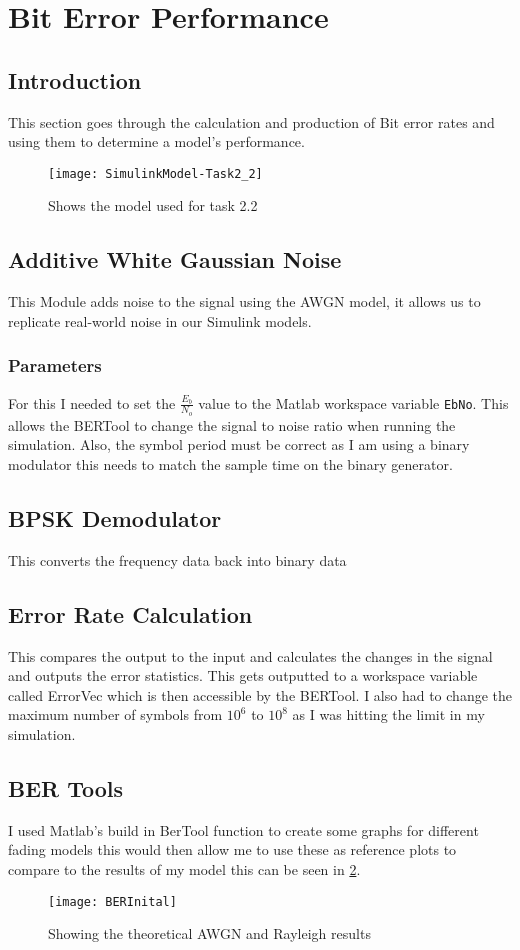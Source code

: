 \section{Bit Error Performance}{
    \subsection{Introduction}
    {
   		This section goes through the calculation and production of Bit error rates and using them to determine a model's performance.
   		\begin{figure}
   			\centering
   			\texttt{[image: SimulinkModel-Task2\_2]}
   			\caption{Shows the model used for task 2.2}
   			\label{fig:2.2SimlinkModel}
   		\end{figure}
   	}
   	\subsection{Additive White Gaussian Noise}
   	{
   		This Module adds noise to the signal using the AWGN model, it allows us to replicate real-world noise in our Simulink models.
   		\subsubsection{Parameters}
   		{
   			For this I needed to set the $\frac{E_b}{N_o}$ value to the Matlab workspace variable \lstinline|EbNo|. This allows the BERTool to change the signal to noise ratio when running the simulation. Also, the symbol period must be correct as I am using a binary modulator this needs to match the sample time on the binary generator.
   		}
	}
	\subsection{BPSK Demodulator}
	{
		This converts the frequency data back into binary data 
	}
	\subsection{Error Rate Calculation}
	{
		This compares the output to the input and calculates the changes in the signal and outputs the error statistics. This gets outputted to a workspace variable called ErrorVec which is then accessible by the BERTool. I also had to change the maximum number of symbols from $10^6$ to $10^8$ as I was hitting the limit in my simulation.
	}
	\subsection{BER Tools}
	{
		I used Matlab's build in BerTool function to create some graphs for different fading models this would then allow me to use these as reference plots to compare to the results of my model this can be seen in \cref{fig:BerInital}.
		\begin{figure}
			\centering
			\texttt{[image: BERInital]}
			\caption{Showing the theoretical AWGN and Rayleigh results}
			\label{fig:BerInital}
		\end{figure}
	}
}
